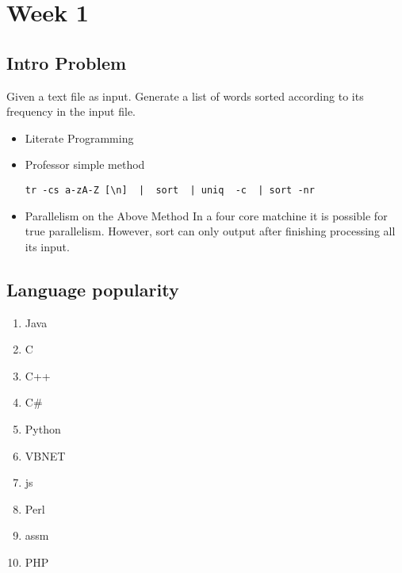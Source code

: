 \documentclass[11pt]{article}
\author{Noel Song}
\date{\today}
\title{}
\begin{document}
\tableofcontents

\section{Week 1}
\label{sec:orgf630056}
\subsection{Intro Problem}
\label{sec:orga78d26b}
Given a text file as input. Generate a list of words sorted according to its
frequency in the input file.

\begin{itemize}
\item Literate Programming

\item Professor simple method
\begin{verbatim}
tr -cs a-zA-Z [\n]  |  sort  | uniq  -c  | sort -nr
\end{verbatim}

\item Parallelism on the Above Method
In a four core matchine it is possible for true parallelism. However, sort
can only output after finishing processing all its input.
\end{itemize}
\subsection{Language popularity}
\label{sec:orgbc87239}
\begin{enumerate}
\item Java
\item C
\item C++
\item C\#
\item Python
\item VBNET
\item js
\item Perl
\item assm
\item PHP
\end{enumerate}
\end{document}
